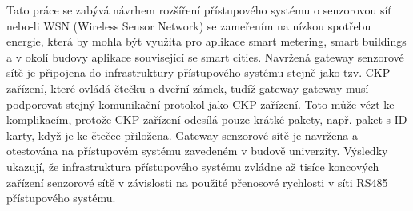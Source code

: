 Tato práce se zabývá návrhem rozšíření přístupového systému o senzorovou síť nebo-li WSN (Wireless Sensor Network) se zameřením na nízkou spotřebu energie, která by mohla být využita pro aplikace smart metering, smart buildings a v okolí budovy aplikace související se smart cities.
Navržená gateway senzorové sítě je připojena do infrastruktury přístupového systému stejně jako tzv. CKP zařízení, které ovládá čtečku a dveřní zámek, tudíž gateway gateway musí podporovat stejný komunikační protokol jako CKP zařízení. 
Toto může vézt ke komplikacím, protože CKP zařízení odesílá pouze krátké pakety, např. paket s ID karty, když je ke čtečce přiložena.
Gateway senzorové sítě je navržena a otestována na přístupovém systému zavedeném v budově univerzity.
Výsledky ukazují, že infrastruktura přístupového systému zvládne až tisíce koncových zařízení senzorové sítě v závislosti na použité přenosové rychlosti v síti RS485 přístupového systému.











